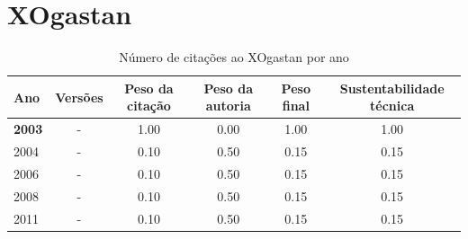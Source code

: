 \section{XOgastan}


\begin{table}[H]
\caption{Número de citações ao XOgastan por ano}
\centering
\begin{tabular}{| l | c | c | c | c | c |}
  \hline
  Ano & Versões & Peso da citação & Peso da autoria & Peso final & Sustentabilidade técnica \\
  \hline
            {\bf 2003}
          &
          -
          &
          1.00
          &
          0.00
          &
          1.00
          &
            {\color{blue} 1.00}
          \\
\hline
            2004
          &
          -
          &
          0.10
          &
          0.50
          &
          0.15
          &
            {\color{red} 0.15}
          \\
\hline
            2006
          &
          -
          &
          0.10
          &
          0.50
          &
          0.15
          &
            {\color{red} 0.15}
          \\
\hline
            2008
          &
          -
          &
          0.10
          &
          0.50
          &
          0.15
          &
            {\color{red} 0.15}
          \\
\hline
            2011
          &
          -
          &
          0.10
          &
          0.50
          &
          0.15
          &
            {\color{red} 0.15}
          \\
\hline
\end{tabular}
\end{table}




